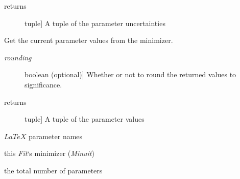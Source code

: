 \documentclass[a4paper,10pt,english]{sphinxmanual}
\begin{document}
\begin{fulllineitems}
\begin{fulllineitems}
\begin{description}
\item[{returns}] \leavevmode{[}tuple{]}
A tuple of the parameter uncertainties

\end{description}

\end{fulllineitems}


\begin{fulllineitems}
\label{index:kafe.fit.Fit.get_parameter_values}
Get the current parameter values from the minimizer.
\begin{description}
\item[{\emph{rounding}}] \leavevmode{[}boolean (optional){]}
Whether or not to round the returned values to significance.

\item[{returns}] \leavevmode{[}tuple{]}
A tuple of the parameter values

\end{description}

\end{fulllineitems}


\begin{fulllineitems}
\label{index:kafe.fit.Fit.latex_parameter_names}
$LaTeX$ parameter names

\end{fulllineitems}


\begin{fulllineitems}
\label{index:kafe.fit.Fit.minimizer}
this \emph{Fit}`s minimizer (\emph{Minuit})

\end{fulllineitems}


\begin{fulllineitems}
\label{index:kafe.fit.Fit.number_of_parameters}
the total number of parameters

\end{fulllineitems}


\end{fulllineitems}
\end{document}
